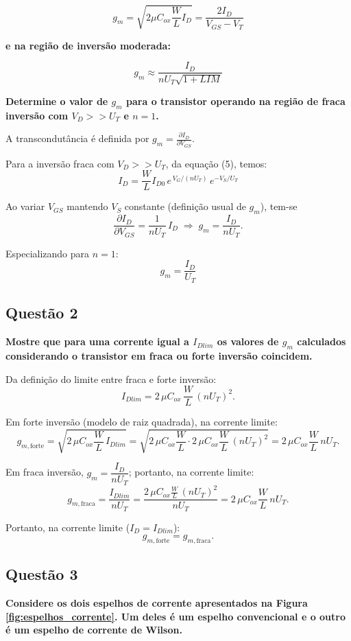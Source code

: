 ﻿\documentclass[12pt,a4paper]{article}
\begin{document}
\begin{equation}
g_m = \sqrt{2\mu C_{ox} \frac{W}{L} I_D} = \frac{2I_D}{V_{GS} - V_T}
\end{equation}

\textbf{e na região de inversão moderada:}

\begin{equation}
g_m \approx \frac{I_D}{nU_T \sqrt{1 +LIM}} 
\end{equation}

\textbf{Determine o valor de $g_m$ para o transistor operando na região de fraca inversão com $V_D >> U_T$ e $n = 1$.}

A transcondutância é definida por $g_m = \frac{\partial I_D}{\partial V_{GS}}$.

Para a inversão fraca com $V_D >> U_T$, da equação (5), temos:
$$I_D = \frac{W}{L} I_{D0}\, e^{\,V_G/(nU_T)}\, e^{-V_S/U_T}$$

Ao variar $V_{GS}$ mantendo $V_S$ constante (definição usual de $g_m$), tem-se
$$\frac{\partial I_D}{\partial V_{GS}} = \frac{1}{nU_T}\, I_D \;\Rightarrow\; g_m = \frac{I_D}{nU_T}.$$

Especializando para $n = 1$:
$$\boxed{g_m = \frac{I_D}{U_T}}$$

\subsection*{Questão 2}
\textbf{Mostre que para uma corrente igual a $I_{Dlim}$ os valores de $g_m$ calculados considerando o transistor em fraca ou forte inversão coincidem.}

Da definição do limite entre fraca e forte inversão:
$$I_{Dlim} = 2\,\mu C_{ox}\,\frac{W}{L}\,(nU_T)^2.$$

Em forte inversão (modelo de raiz quadrada), na corrente limite:
$$g_{m,\text{forte}}=\sqrt{2\,\mu C_{ox}\frac{W}{L}\,I_{Dlim}}
=\sqrt{2\,\mu C_{ox}\frac{W}{L}\cdot 2\,\mu C_{ox}\frac{W}{L}\,(nU_T)^2}
=2\,\mu C_{ox}\frac{W}{L}\,nU_T.$$

Em fraca inversão, $g_m=\dfrac{I_D}{nU_T}$; portanto, na corrente limite:
$$g_{m,\text{fraca}}=\frac{I_{Dlim}}{nU_T}
=\frac{2\,\mu C_{ox}\frac{W}{L}\,(nU_T)^2}{nU_T}
=2\,\mu C_{ox}\frac{W}{L}\,nU_T.$$

Portanto, na corrente limite ($I_D=I_{Dlim}$):
$$\boxed{g_{m,\text{forte}} = g_{m,\text{fraca}}}.$$

\subsection*{Questão 3}
	\textbf{Considere os dois espelhos de corrente apresentados na Figura \ref{fig:espelhos_corrente}. Um deles é um espelho convencional e o outro é um espelho de corrente de Wilson.}
\end{document}
